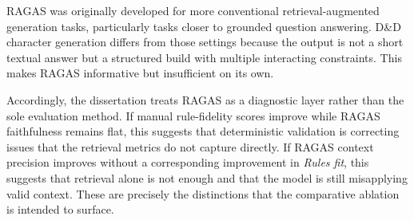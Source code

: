 RAGAS was originally developed for more conventional retrieval-augmented generation tasks, particularly tasks closer to grounded question answering. D\&D character generation differs from those settings because the output is not a short textual answer but a structured build with multiple interacting constraints. This makes RAGAS informative but insufficient on its own.

Accordingly, the dissertation treats RAGAS as a diagnostic layer rather than the sole evaluation method. If manual rule-fidelity scores improve while RAGAS faithfulness remains flat, this suggests that deterministic validation is correcting issues that the retrieval metrics do not capture directly. If RAGAS context precision improves without a corresponding improvement in \textit{Rules fit}, this suggests that retrieval alone is not enough and that the model is still misapplying valid context. These are precisely the distinctions that the comparative ablation is intended to surface.
